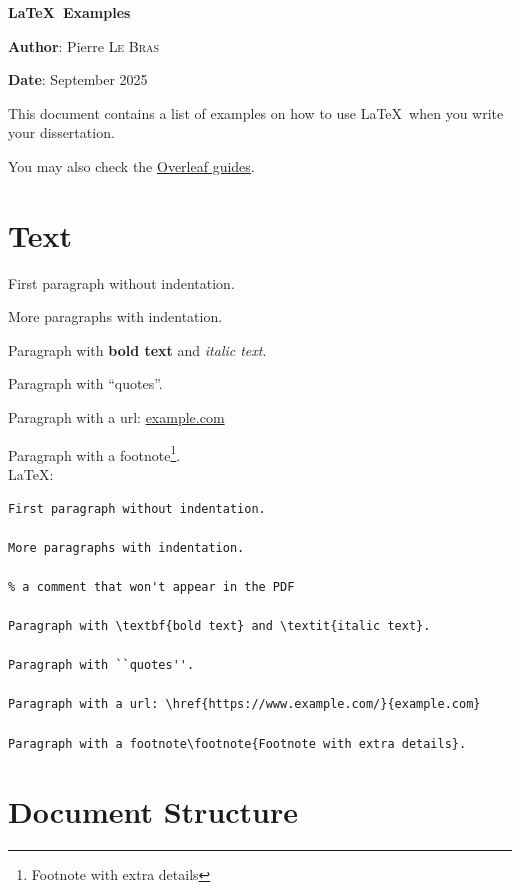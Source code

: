 \documentclass[12pt,nonacm,acmlarge,titlepage,screen]{acmart}
\def\docAuthor{Pierre \textsc{Le Bras}}
\begin{document}
\begin{center}
    {\Huge \textbf{\LaTeX\ Examples}}
\end{center}
\vspace{2cm}

\noindent \textbf{Author}: \docAuthor

\noindent \textbf{Date}:  September 2025

\noindent This document contains a list of examples on how to use \LaTeX\ when you write your dissertation.

You may also check the \href{https://www.overleaf.com/learn}{Overleaf guides}.

\section*{Text}

First paragraph without indentation. 

More paragraphs with indentation.


Paragraph with \textbf{bold text} and \textit{italic text}.

Paragraph with ``quotes''.

Paragraph with a url: \href{https://www.example.com/}{example.com}

Paragraph with a footnote\footnote{Footnote with extra details}.
~\\

\noindent\LaTeX:
\begin{Verbatim}[frame=single]
First paragraph without indentation. 

More paragraphs with indentation.

% a comment that won't appear in the PDF

Paragraph with \textbf{bold text} and \textit{italic text}.

Paragraph with ``quotes''.

Paragraph with a url: \href{https://www.example.com/}{example.com}

Paragraph with a footnote\footnote{Footnote with extra details}.
\end{Verbatim}

\section*{Document Structure}
\end{document}
